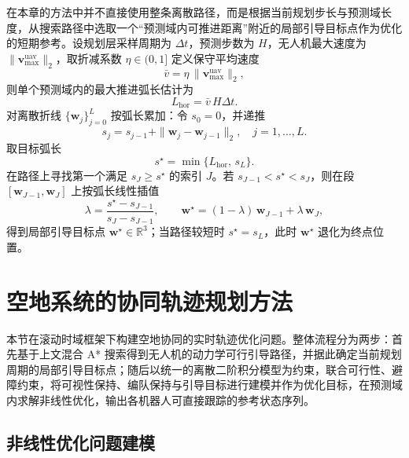 在本章的方法中并不直接使用整条离散路径，而是根据当前规划步长与预测域长度，从搜索路径中选取一个“预测域内可推进距离”附近的局部引导目标点作为优化的短期参考。设规划层采样周期为 \(\Delta t\)，预测步数为 \(H\)，无人机最大速度为 \(\|\mathbf{v}_{\max}^{\mathrm{uav}}\|_2\)，取折减系数 \(\eta\in(0,1]\) 定义保守平均速度
\begin{equation}
\bar v=\eta\,\big\|\mathbf{v}_{\max}^{\mathrm{uav}}\big\|_2,
\label{eq:wp_vbar}
\end{equation}
则单个预测域内的最大推进弧长估计为
\begin{equation}
L_{\mathrm{hor}}=\bar v\,H\Delta t .
\label{eq:wp_Lhor}
\end{equation}
对离散折线 \(\{\mathbf{w}_j\}_{j=0}^{L}\) 按弧长累加：令 \(s_0=0\)，并递推
\[
s_j=s_{j-1}+\|\mathbf{w}_j-\mathbf{w}_{j-1}\|_2,\quad j=1,\dots,L.
\]
取目标弧长
\begin{equation}
s^\star=\min\{L_{\mathrm{hor}},\,s_L\}.
\label{eq:wp_sstar}
\end{equation}
在路径上寻找第一个满足 \(s_J\ge s^\star\) 的索引 \(J\)。若 \(s_{J-1}<s^\star<s_J\)，则在段 \([\mathbf{w}_{J-1},\mathbf{w}_J]\) 上按弧长线性插值
\begin{equation}
\lambda=\frac{s^\star-s_{J-1}}{s_J-s_{J-1}},\qquad
\mathbf{w}^\star=(1-\lambda)\,\mathbf{w}_{J-1}+\lambda\,\mathbf{w}_J,
\label{eq:wp_interp}
\end{equation}
得到局部引导目标点 \(\mathbf{w}^\star\in\mathbb{R}^3\)；当路径较短时 \(s^\star=s_L\)，此时 \(\mathbf{w}^\star\) 退化为终点位置。

\section{空地系统的协同轨迹规划方法} \label{sec:traj_opt}
本节在滚动时域框架下构建空地协同的实时轨迹优化问题。整体流程分为两步：首先基于上文混合 A* 搜索得到无人机的动力学可行引导路径，并据此确定当前规划周期的局部引导目标点；随后以统一的离散二阶积分模型为约束，联合可行性、避障约束，将可视性保持、编队保持与引导目标进行建模并作为优化目标，在预测域内求解非线性优化，输出各机器人可直接跟踪的参考状态序列。

\subsection{非线性优化问题建模} \label{sec:opt_modeling}

